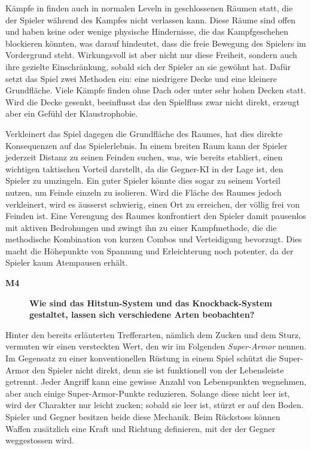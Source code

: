 \documentclass[../Main.tex]{subfiles}
\begin{document}
Kämpfe in  finden auch in normalen Leveln in geschlossenen Räumen statt, die der Spieler während des Kampfes nicht verlassen kann. Diese Räume sind offen und haben keine oder wenige physische Hindernisse, die das Kampfgeschehen blockieren könnten, was darauf hindeutet, dass die freie Bewegung des Spielers im Vordergrund steht. Wirkungsvoll ist aber nicht nur diese Freiheit, sondern auch ihre gezielte Einschränkung, sobald sich der Spieler an sie gewöhnt hat. Dafür setzt das Spiel zwei Methoden ein: eine niedrigere Decke und eine kleinere Grundfläche. Viele Kämpfe finden ohne Dach oder unter sehr hohen Decken statt. Wird die Decke gesenkt, beeinflusst das den Spielfluss zwar nicht direkt, erzeugt aber ein Gefühl der Klaustrophobie.

Verkleinert das Spiel dagegen die Grundfläche des Raumes, hat dies direkte Konsequenzen auf das Spielerlebnis. In einem breiten Raum kann der Spieler jederzeit Distanz zu seinen Feinden suchen, was, wie bereits etabliert, einen wichtigen taktischen Vorteil darstellt, da die Gegner-KI in der Lage ist, den Spieler zu umzingeln. Ein guter Spieler könnte dies sogar zu seinem Vorteil nutzen, um Feinde einzeln zu isolieren. Wird die Fläche des Raumes jedoch verkleinert, wird es äusserst schwierig, einen Ort zu erreichen, der völlig frei von Feinden ist. Eine Verengung des Raumes konfrontiert den Spieler damit pausenlos mit aktiven Bedrohungen und zwingt ihn zu einer Kampfmethode, die die methodische Kombination von kurzen Combos und Verteidigung bevorzugt. Dies macht die Höhepunkte von Spannung und Erleichterung noch potenter, da der Spieler kaum Atempausen erhält.

\begin{description}
    \item[\textbf{M4}] \textbf{Wie sind das Hitstun-System und das Knockback-System gestaltet, lassen sich verschiedene Arten beobachten?}
\end{description}

Hinter den bereits erläuterten Trefferarten, nämlich dem Zucken und dem Sturz, vermuten wir einen versteckten Wert, den wir im Folgenden \textit{Super-Armor} nennen. Im Gegensatz zu einer konventionellen Rüstung in einem Spiel schützt die Super-Armor den Spieler nicht direkt, denn sie ist funktionell von der Lebensleiste getrennt. Jeder Angriff kann eine gewisse Anzahl von Lebenspunkten wegnehmen, aber auch einige Super-Armor-Punkte reduzieren. Solange diese nicht leer ist, wird der Charakter nur leicht zucken; sobald sie leer ist, stürzt er auf den Boden. Spieler und Gegner besitzen beide diese Mechanik. Beim Rückstoss können Waffen zusätzlich eine Kraft und Richtung definieren, mit der der Gegner weggestossen wird.
\end{document}
